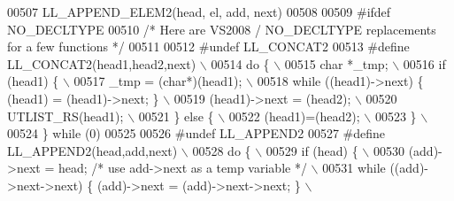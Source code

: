 \begin{DoxyCode}
00507 \textcolor{preprocessor}{    LL\_APPEND\_ELEM2(head, el, add, next)}
00508 
00509 \textcolor{preprocessor}{#ifdef NO\_DECLTYPE}
00510 \textcolor{comment}{/* Here are VS2008 / NO\_DECLTYPE replacements for a few functions */}
00511 
00512 \textcolor{preprocessor}{#undef LL\_CONCAT2}
00513 \textcolor{preprocessor}{#define LL\_CONCAT2(head1,head2,next)                                                           \(\backslash\)}
00514 \textcolor{preprocessor}{do \{                                                                                           \(\backslash\)}
00515 \textcolor{preprocessor}{  char *\_tmp;                                                                                  \(\backslash\)}
00516 \textcolor{preprocessor}{  if (head1) \{                                                                                 \(\backslash\)}
00517 \textcolor{preprocessor}{    \_tmp = (char*)(head1);                                                                     \(\backslash\)}
00518 \textcolor{preprocessor}{    while ((head1)->next) \{ (head1) = (head1)->next; \}                                         \(\backslash\)}
00519 \textcolor{preprocessor}{    (head1)->next = (head2);                                                                   \(\backslash\)}
00520 \textcolor{preprocessor}{    UTLIST\_RS(head1);                                                                          \(\backslash\)}
00521 \textcolor{preprocessor}{  \} else \{                                                                                     \(\backslash\)}
00522 \textcolor{preprocessor}{    (head1)=(head2);                                                                           \(\backslash\)}
00523 \textcolor{preprocessor}{  \}                                                                                            \(\backslash\)}
00524 \textcolor{preprocessor}{\} while (0)}
00525 
00526 \textcolor{preprocessor}{#undef LL\_APPEND2}
00527 \textcolor{preprocessor}{#define LL\_APPEND2(head,add,next)                                                              \(\backslash\)}
00528 \textcolor{preprocessor}{do \{                                                                                           \(\backslash\)}
00529 \textcolor{preprocessor}{  if (head) \{                                                                                  \(\backslash\)}
00530 \textcolor{preprocessor}{    (add)->next = head;     }\textcolor{comment}{/* use add->next as a temp variable */}\textcolor{preprocessor}{                             \(\backslash\)}
00531 \textcolor{preprocessor}{    while ((add)->next->next) \{ (add)->next = (add)->next->next; \}                             \(\backslash\)}

\end{DoxyCode}
